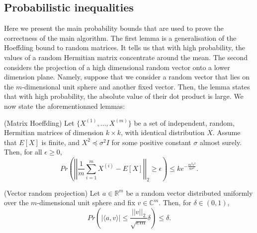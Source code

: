 \subsection{Probabilistic inequalities}
Here we present the main probability bounds that are used to prove the correctness of the main algorithm. The first lemma is a generalisation of the Hoeffding bound to random matrices. It tells us that with high probability, the values of a random Hermitian matrix concentrate around the mean. The second considers the projection of a high dimensional random vector onto a lower dimension plane. Namely, suppose that we consider a random vector that lies on the $m$-dimensional unit sphere and another fixed vector. Then, the lemma states that with high probability, the absolute value of their dot product is large. We now state the aforementionned lemmas:
\begin{lemma} (Matrix Hoeffding)
    Let $\{X^{(1)},\ldots,X^{(m)}\}$ be a set of independent, random, Hermitian matrices of dimension $k\times k$, with identical distribution $X$. Assume that $E[X]$ is finite, and $X^2\preceq\sigma^2 I$ for some positive constant $\sigma$ almost surely. Then, for all $\epsilon\geq 0$, $$Pr\left(\left|\left|\frac{1}{m}\sum_{i=1}^m X^{(i)} - E[X]\right|\right|_2\geq\epsilon\right)\leq ke^{-\frac{m^2\epsilon^2}{8\sigma^2}}.$$
\end{lemma}
\begin{lemma} (Vector random projection)
    Let $a\in\mathbb{R}^m$ be a random vector distributed uniformly over the $m$-dimensional unit sphere and fix $v\in\mathbb{C}^m$. Then, for $\delta\in(0,1)$, $$Pr\left(|\langle a,v\rangle|\leq\frac{||v||_2}{\sqrt{em}}\delta\right)\leq\delta.$$
\end{lemma}
